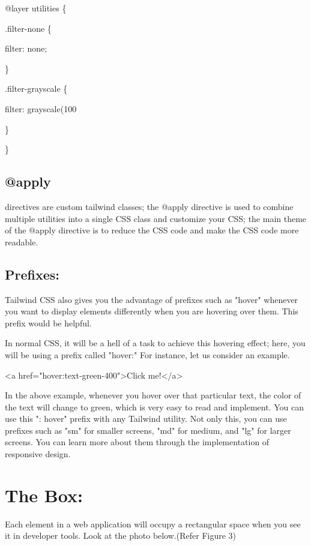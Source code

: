 \documentclass[conference]{IEEEtran}
\begin{document}
@layer utilities \{

.filter-none \{

filter: none;

\}

.filter-grayscale \{

filter: grayscale(100%

\}

\}
\subsection{@apply}
directives are custom tailwind classes; the @apply directive is used to combine multiple utilities into a single CSS class and customize your CSS; the main theme of the @apply directive is to reduce the CSS code and make the CSS code more readable.
\subsection{Prefixes:}
Tailwind CSS also gives you the advantage of prefixes such as "hover" whenever you want to display elements differently when you are hovering over them. This prefix would be helpful.

In normal CSS, it will be a hell of a task to achieve this hovering
effect; here, you will be using a prefix called "hover:" For instance, let us consider an example.
\newline

\textless a href="hover:text-green-400"\textgreater Click
me!\textless/a\textgreater{}
\newline

In the above example, whenever you hover over that particular text, the color of the text will change to green, which is very easy to read and implement. You can use this ": hover" prefix with any Tailwind utility. Not only this, you can use prefixes such as "sm" for smaller screens, "md" for medium, and "lg" for larger screens. You can learn more about them through the implementation of responsive design.

\section{The Box:}\label{the-box}

Each element in a web application will occupy a rectangular space when you see it in developer tools. Look at the photo below.(Refer Figure 3)
\end{document}
